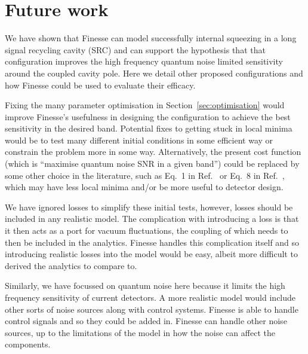 \documentclass[aps,pra,superscriptaddress,reprint,nofootinbib]{revtex4-1}
\begin{document}
\section{Future work}
\label{sec:future_work}

We have shown that Finesse can model successfully internal squeezing in a long signal recycling cavity (SRC) and can support the hypothesis that that configuration improves the high frequency quantum noise limited sensitivity around the coupled cavity pole. Here we detail other proposed configurations and how Finesse could be used to evaluate their efficacy.


Fixing the many parameter optimisation in Section~\ref{sec:optimisation} would improve Finesse’s usefulness in designing the configuration to achieve the best sensitivity in the desired band. Potential fixes to getting stuck in local minima would be to test many different initial conditions in some efficient way or constrain the problem more in some way. Alternatively, the present cost function (which is “maximise quantum noise SNR in a given band”) could be replaced by some other choice in the literature, such as Eq.~1 in Ref.~\cite{Miao_2014} or Eq.~8 in Ref.~\cite{Martynov_2019}, which may have less local minima and/or be more useful to detector design.


We have ignored losses to simplify these initial tests, however, losses should be included in any realistic model. The complication with introducing a loss is that it then acts as a port for vacuum fluctuations, the coupling of which needs to then be included in the analytics. Finesse handles this complication itself and so introducing realistic losses into the model would be easy, albeit more difficult to derived the analytics to compare to.


Similarly, we have focussed on quantum noise here because it limits the high frequency sensitivity of current detectors. A more realistic model would include other sorts of noise sources along with control systems. Finesse is able to handle control signals and so they could be added in. Finesse can handle other noise sources, up to the limitations of the model in how the noise can affect the components.
\end{document}

